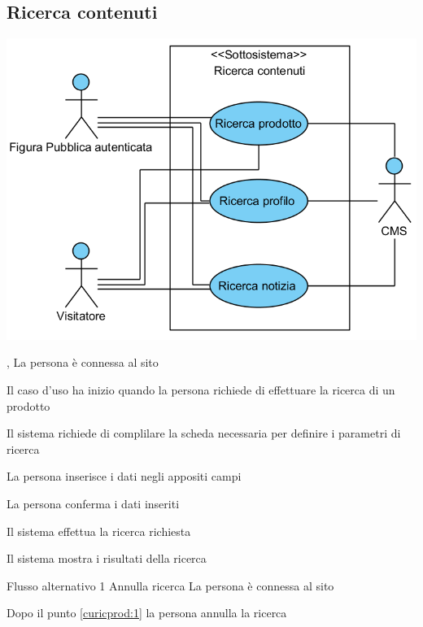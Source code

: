 \subsection{Ricerca contenuti}
\begin{center}
   \includegraphics[width=\textwidth]{assets/visualParadigm/RicercaContenuti}
\end{center}
{, }
{La persona è connessa al sito}
{\postNulle}
{\begin{enumCU}
	\item Il caso d'uso ha inizio quando la persona richiede di effettuare la ricerca di un prodotto
	\item Il sistema richiede di complilare la scheda necessaria per definire i parametri di ricerca
	\item La persona inserisce i dati negli appositi campi \label{curicprod:1}
	\item La persona conferma i dati inseriti
	\item Il sistema effettua la ricerca richiesta
	\item Il sistema mostra i risultati della ricerca
	
\end{enumCU}}
%
{Flusso alternativo 1}%
{Annulla ricerca}%
{La persona è connessa al sito}%
{\postNulle}%
{\begin{enumCU}
		\item Dopo il punto \ref{curicprod:1} la persona annulla la ricerca
	\end{enumCU}}%

